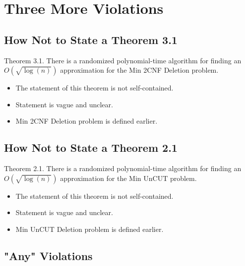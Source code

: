 \documentclass[11pt]{article}
\begin{document}

\section{Three More Violations}

\subsection{How Not to State a Theorem 3.1}

Theorem 3.1. There is a randomized polynomial-time algorithm for finding an 
$O( \sqrt{\log (n)})$ approximation for the Min 2CNF Deletion problem.

\begin{itemize}
    \item The statement of this theorem is {\color{red}not} self-contained.
    \item Statement is vague and unclear.
    \item Min 2CNF Deletion problem is defined earlier. 
\end{itemize}

\subsection{How Not to State a Theorem 2.1}
Theorem 2.1. There is a randomized polynomial-time algorithm for finding an 
$O( \sqrt{\log (n)})$ approximation for the Min UnCUT problem.

\begin{itemize}
    \item The statement of this theorem is {\color{red}not} self-contained.
    \item Statement is vague and unclear.
    \item Min UnCUT Deletion problem is defined earlier. 
\end{itemize}


\subsection{{\ttfamily"}Any{\ttfamily"} Violations}
\end{document}
